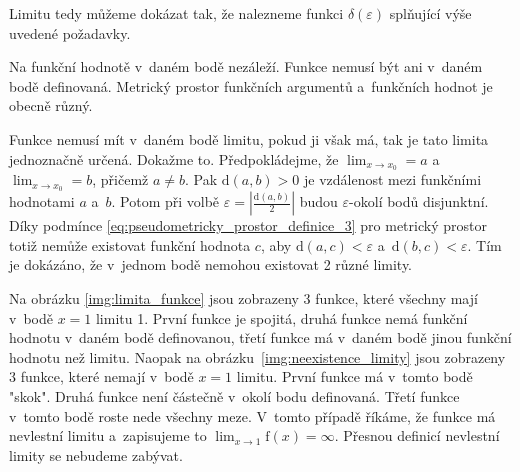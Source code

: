Limitu tedy můžeme dokázat tak, že nalezneme funkci \(\delta(\varepsilon)\) splňující výše uvedené požadavky.

Na funkční hodnotě v~daném bodě nezáleží. Funkce nemusí být ani v~daném bodě definovaná. Metrický prostor funkčních argumentů a~funkčních hodnot je obecně různý.

Funkce nemusí mít v~daném bodě limitu, pokud ji však má, tak je tato limita jednoznačně určená. Dokažme to. Předpokládejme, že \(\lim_{x \to x_0} = a\) a~\(\lim_{x \to x_0} = b\), přičemž \(a \neq b\). Pak \(\mathrm{d}(a, b) > 0\) je vzdálenost mezi funkčními hodnotami \(a\) a~\(b\). Potom při volbě \(\varepsilon = \left| \frac{\mathrm{d}(a, b)}{2} \right|\) budou \(\varepsilon\)-okolí bodů disjunktní. Díky podmínce \eqref{eq:pseudometricky_prostor_definice_3} pro metrický prostor totiž nemůže existovat funkční hodnota \(c\), aby \(\mathrm{d}(a, c) < \varepsilon\) a~\(\mathrm{d}(b, c) < \varepsilon\). Tím je dokázáno, že v~jednom bodě nemohou existovat 2 různé limity.

Na obrázku \ref{img:limita_funkce} jsou zobrazeny 3 funkce, které všechny mají v~bodě \(x = 1\) limitu 1. První funkce je spojitá, druhá funkce nemá funkční hodnotu v~daném bodě definovanou, třetí funkce má v~daném bodě jinou funkční hodnotu než limitu. Naopak na obrázku~\ref{img:neexistence_limity} jsou zobrazeny 3 funkce, které nemají v~bodě \(x = 1\) limitu. První funkce má v~tomto bodě "skok". Druhá funkce není částečně v~okolí bodu definovaná. Třetí funkce v~tomto bodě roste nede všechny meze. V~tomto případě říkáme, že funkce má nevlestní limitu a~zapisujeme to \(\lim_{x \to 1} \mathrm{f}(x) = \infty\). Přesnou definicí nevlestní limity se nebudeme zabývat.
 
